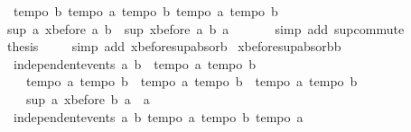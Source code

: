 \begin{isabellebody}
\ \ {\isachardoublequoteopen}tempo{}\ b{\isachardoublequoteclose}\ {\isachardoublequoteopen}tempo{}\ a{\isachardoublequoteclose}\ {\isachardoublequoteopen}tempo{}\ b{\isachardoublequoteclose}\ {\isachardoublequoteopen}tempo{}\ a{\isachardoublequoteclose}\ {\isachardoublequoteopen}tempo{}\ b{\isachardoublequoteclose}\isanewline
\ \ \isamarkupfalse%
\ {\isachardoublequoteopen}sup\ a\ {\isacharparenleft}xbefore\ a\ b{\isacharparenright}\ {\isacharequal}\ sup\ {\isacharparenleft}xbefore\ a\ b{\isacharparenright}\ a{\isachardoublequoteclose}\ \isanewline
\ \ \ \ \isamarkupfalse%
\ {\isacharparenleft}simp\ add{\isacharcolon}\ sup{\isachardot}commute{\isacharparenright}\isanewline
\ \ \isamarkupfalse%
\ {\isacharquery}thesis\ \isamarkupfalse%
\ {}\ \isamarkupfalse%
\ {\isacharparenleft}simp\ add{\isacharcolon}\ xbefore{\isacharunderscore}sup{\isacharunderscore}absorb{\isacharunderscore}{}{\isacharparenright}\isanewline
{}\isamarkupfalse%
%
\endisatagproof
{\isafoldproof}%
%
\isadelimproof
\isanewline
%
\endisadelimproof
\isanewline
{}\isamarkupfalse%
\ xbefore{\isacharunderscore}sup{\isacharunderscore}absorb{\isacharunderscore}{}b{\isacharcolon}\ \isanewline
\ \ {\isachardoublequoteopen}independent{\isacharunderscore}events\ a\ b\ {\isasymLongrightarrow}\ {\isasymlbrakk}tempo{}\ a{\isacharsemicolon}\ tempo{}\ b{\isasymrbrakk}\ {\isasymLongrightarrow}\ \isanewline
\ \ \ \ {\isasymlbrakk}tempo{}\ a{\isacharsemicolon}\ tempo{}\ b{\isasymrbrakk}\ {\isasymLongrightarrow}\ {\isasymlbrakk}tempo{}\ a{\isacharsemicolon}\ tempo{}\ b{\isasymrbrakk}\ {\isasymLongrightarrow}\ {\isasymlbrakk}tempo{}\ a{\isacharsemicolon}\ tempo{}\ b{\isasymrbrakk}\ {\isasymLongrightarrow}\isanewline
\ \ \ \ sup\ a\ {\isacharparenleft}xbefore\ b\ a{\isacharparenright}\ {\isacharequal}\ a{\isachardoublequoteclose}\isanewline
%
\isadelimproof
%
\endisadelimproof
%
\isatagproof
{}\isamarkupfalse%
{\isacharminus}\isanewline
\ \ \isamarkupfalse%
\ {}{\isacharcolon}\ {\isachardoublequoteopen}independent{\isacharunderscore}events\ a\ b{\isachardoublequoteclose}\ {\isachardoublequoteopen}tempo{}\ a{\isachardoublequoteclose}\ {\isachardoublequoteopen}tempo{}\ b{\isachardoublequoteclose}\ {\isachardoublequoteopen}tempo{}\ a{\isachardoublequoteclose}\ \isanewline

\end{isabellebody}
